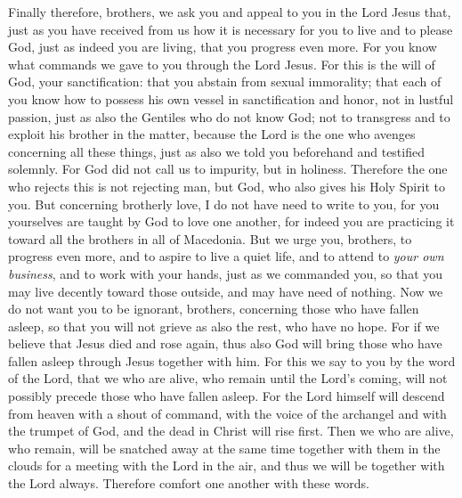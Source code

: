 \begin{biblechapter} %
 Finally therefore, brothers, we ask you and appeal to you in the Lord Jesus that, just as you have received from us how it is necessary for you to live and to please God, just as indeed you are living, that you progress even more.
\verse For you know what commands we gave to you through the Lord Jesus.
\verse For this is the will of God, your sanctification: that you abstain from sexual immorality;
\verse that each of you know how to possess his own vessel in sanctification and honor,
\verse not in lustful passion, just as also the Gentiles who do not know God;
\verse not to transgress and to exploit his brother in the matter, because the Lord is the one who avenges concerning all these things, just as also we told you beforehand and testified solemnly.
\verse For God did not call us to impurity, but in holiness.
\verse Therefore the one who rejects this is not rejecting man, but God, who also gives his Holy Spirit to you.
 But concerning brotherly love, I do not have need to write to you, for you yourselves are taught by God to love one another,
\verse for indeed you are practicing it toward all the brothers in all of Macedonia. But we urge you, brothers, to progress even more,
\verse and to aspire to live a quiet life, and to attend to \textit{your own business}, and to work with your hands, just as we commanded you,
\verse so that you may live decently toward those outside, and may have need of nothing.
 Now we do not want you to be ignorant, brothers, concerning those who have fallen asleep, so that you will not grieve as also the rest, who have no hope.
\verse For if we believe that Jesus died and rose again, thus also God will bring those who have fallen asleep through Jesus together with him.
\verse For this we say to you by the word of the Lord, that we who are alive, who remain until the Lord’s coming, will not possibly precede those who have fallen asleep.
\verse For the Lord himself will descend from heaven with a shout of command, with the voice of the archangel and with the trumpet of God, and the dead in Christ will rise first.
\verse Then we who are alive, who remain, will be snatched away at the same time together with them in the clouds for a meeting with the Lord in the air, and thus we will be together with the Lord always.
\verse Therefore comfort one another with these words.
\end{biblechapter}

